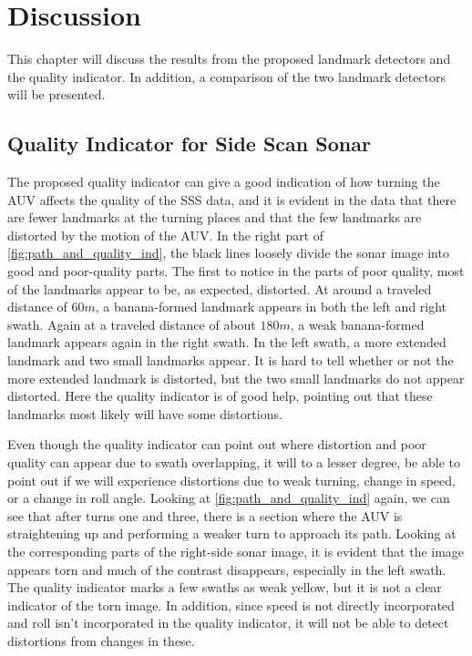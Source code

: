 \chapter{Discussion}

This chapter will discuss the results from the proposed landmark detectors and the quality indicator. In addition, a comparison of the two landmark detectors will be presented. 

\section{Quality Indicator for Side Scan Sonar}

The proposed quality indicator can give a good indication of how turning the AUV affects the quality of the SSS data, and it is evident in the data that there are fewer landmarks at the turning places and that the few landmarks are distorted by the motion of the AUV. In the right part of \cref{fig:path_and_quality_ind}, the black lines loosely divide the sonar image into good and poor-quality parts. The first to notice in the parts of poor quality, most of the landmarks appear to be, as expected, distorted. At around a traveled distance of $60 m$, a banana-formed landmark appears in both the left and right swath. Again at a traveled distance of about $180 m$, a weak banana-formed landmark appears again in the right swath. In the left swath, a more extended landmark and two small landmarks appear. It is hard to tell whether or not the more extended landmark is distorted, but the two small landmarks do not appear distorted. Here the quality indicator is of good help, pointing out that these landmarks most likely will have some distortions. 

Even though the quality indicator can point out where distortion and poor quality can appear due to swath overlapping, it will to a lesser degree, be able to point out if we will experience distortions due to weak turning, change in speed, or a change in roll angle. Looking at \cref{fig:path_and_quality_ind} again, we can see that after turns one and three, there is a section where the AUV is straightening up and performing a weaker turn to approach its path. Looking at the corresponding parts of the right-side sonar image, it is evident that the image appears torn and much of the contrast disappears, especially in the left swath. The quality indicator marks a few swaths as weak yellow, but it is not a clear indicator of the torn image. In addition, since speed is not directly incorporated and roll isn't incorporated in the quality indicator, it will not be able to detect distortions from changes in these. 

